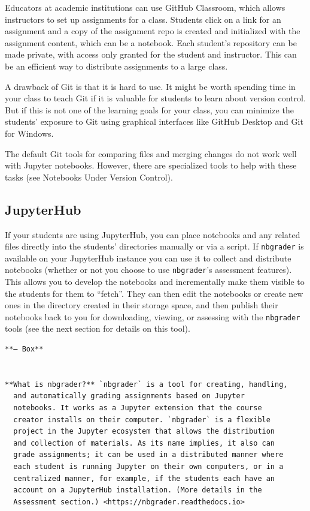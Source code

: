 \documentclass[]{book}
\begin{document}
Educators at academic institutions can use GitHub Classroom, which
allows instructors to set up assignments for a class. Students click on
a link for an assignment and a copy of the assignment repo is created
and initialized with the assignment content, which can be a notebook.
Each student's repository can be made private, with access only granted
for the student and instructor. This can be an efficient way to
distribute assignments to a large class.

A drawback of Git is that it is hard to use. It might be worth spending
time in your class to teach Git if it is valuable for students to learn
about version control. But if this is not one of the learning goals for
your class, you can minimize the students' exposure to Git using
graphical interfaces like GitHub Desktop and Git for Windows.

The default Git tools for comparing files and merging changes do not
work well with Jupyter notebooks. However, there are specialized tools
to help with these tasks (see Notebooks Under Version Control).

\subsection{JupyterHub}\label{jupyterhub}

If your students are using JupyterHub, you can place notebooks and any
related files directly into the students' directories manually or via a
script. If \texttt{nbgrader} is available on your JupyterHub instance
you can use it to collect and distribute notebooks (whether or not you
choose to use \texttt{nbgrader}'s assessment features). This allows you
to develop the notebooks and incrementally make them visible to the
students for them to ``fetch''. They can then edit the notebooks or
create new ones in the directory created in their storage space, and
then publish their notebooks back to you for downloading, viewing, or
assessing with the \texttt{nbgrader} tools (see the next section for
details on this tool).

\begin{verbatim}
**— Box**


**What is nbgrader?** `nbgrader` is a tool for creating, handling,
  and automatically grading assignments based on Jupyter
  notebooks. It works as a Jupyter extension that the course
  creator installs on their computer. `nbgrader` is a flexible
  project in the Jupyter ecosystem that allows the distribution
  and collection of materials. As its name implies, it also can
  grade assignments; it can be used in a distributed manner where
  each student is running Jupyter on their own computers, or in a
  centralized manner, for example, if the students each have an
  account on a JupyterHub installation. (More details in the
  Assessment section.) <https://nbgrader.readthedocs.io>
\end{verbatim}
\end{document}
